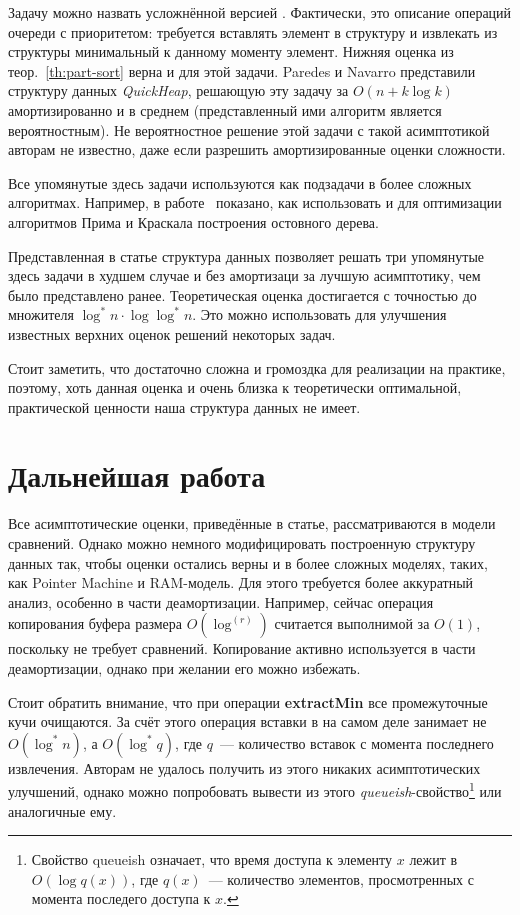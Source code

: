 Задачу \PriQ можно назвать усложнённой версией \PartSort. Фактически,
это описание операций очереди с приоритетом: требуется вставлять
элемент в структуру и извлекать из структуры минимальный к данному
моменту элемент. Нижняя оценка из теор.~\ref{th:part-sort} верна и
для этой задачи. Paredes и Navarro представили структуру данных
\emph{QuickHeap}\cite{quick-heap}, решающую эту задачу
за $O(n + k \log k)$ амортизированно и в среднем (представленный ими
алгоритм является вероятностным). Не вероятностное решение этой
задачи с такой асимптотикой авторам не известно, даже
если разрешить амортизированные оценки сложности.

Все упомянутые здесь задачи используются как подзадачи в более
сложных алгоритмах. Например, в работе~\cite{quick-heap} показано,
как использовать \IncSort и \PriQ для оптимизации алгоритмов
Прима и Краскала построения остовного дерева.

Представленная в статье структура данных \CH позволяет
решать три упомянутые здесь задачи в худшем случае и без амортизаци
за лучшую асимптотику, чем было представлено ранее. Теоретическая
оценка достигается с точностью до множителя $\log^*n \cdot \log \log^*n$.
Это можно использовать для улучшения известных верхних оценок
решений некоторых задач.

Стоит заметить, что \CH достаточно сложна и громоздка для реализации
на практике, поэтому, хоть данная оценка и очень близка к теоретически
оптимальной, практической ценности наша структура данных не имеет.

\section{Дальнейшая работа}
Все асимптотические оценки, приведённые в статье, рассматриваются
в модели сравнений. Однако можно немного модифицировать построенную
структуру данных так, чтобы оценки остались верны и в более сложных моделях,
таких, как Pointer Machine и RAM-модель. Для этого требуется более
аккуратный анализ, особенно в части деамортизации. Например, сейчас
операция копирования буфера размера $O(\log^{(r)})$ считается
выполнимой за $O(1)$, поскольку не требует сравнений. Копирование
активно используется в части деамортизации, однако при желании его можно
избежать.

Стоит обратить внимание, что при операции \textbf{extractMin}
все промежуточные кучи очищаются. За счёт этого операция
вставки в \CH[*] на самом деле занимает не $O(\log^* n)$,
а $O(\log^* q)$, где $q$~--- количество вставок с момента последнего
извлечения. Авторам не удалось получить из этого никаких асимптотических
улучшений, однако можно попробовать вывести из этого \emph{queueish}-свойство\footnote{
    Свойство queueish означает, что время доступа к элементу $x$ лежит в $O(\log q(x))$,
    где $q(x)$~--- количество элементов, просмотренных с момента последего доступа к $x$.}
или аналогичные ему.
